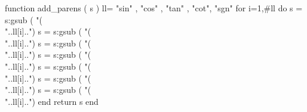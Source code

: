 \newenvironment{hint}
    {\begin{quote}\small\itshape \textbf{Hint:} \setstretch{1.5}}
    {\end{quote}}

\begin{luacode}
function add_parens ( s )
  ll= { "sin" , "cos" , "tan" , "cot", "sgn" }
  for i=1,#ll do
    s = s:gsub ( "(\\"..ll[i]..")%
    s = s:gsub ( "(\\"..ll[i]..")%
    s = s:gsub ( "(\\"..ll[i]..")%
    s = s:gsub ( "(\\"..ll[i]..")%
    s = s:gsub ( "(\\"..ll[i]..")%
    s = s:gsub ( "(\\"..ll[i]..")%
    s = s:gsub ( "(\\"..ll[i]..")%
  end  
  return s
end
\end{luacode}
\newcommand\AddParensOn{\directlua{ luatexbase.add_to_callback 
  ( "process_input_buffer" , add_parens , "AddParens" )}}
\newcommand\AddParensOff{\directlua{ luatexbase.remove_from_callback 
  ( "process_input_buffer" , "AddParens" )}}